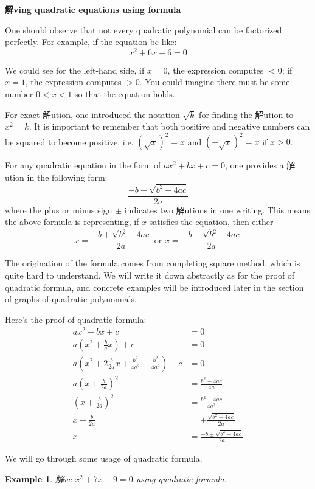 \documentclass[12pt]{article}
\newtheorem{example}{Example}
\begin{document}
    \begin{center}
        \textbf{解ving quadratic equations using formula}
    \end{center}

    One should observe that not every quadratic polynomial can be factorized perfectly. For example, if the equation be like:$$x^2+6x-6=0$$

    We could see for the left-hand side, if $x=0$, the expression computes $<0$; if $x=1$, the expression computes $>0$. You could imagine there must be some number $0<x<1$ so that the equation holds.
    
    For exact 解ution, one introduced the notation $\sqrt{k}$ for finding the 解ution to $x^2=k$. It is important to remember that both positive and negative numbers can be squared to become positive, i.e. $(\sqrt{x})^2=x$ and $(-\sqrt{x})^2=x$ if $x>0$.

    For any quadratic equation in the form of $ax^2+bx+c=0$, one provides a 解ution in the following form:$$\frac{-b\pm\sqrt{b^2-4ac}}{2a}$$where the plus or minus sign $\pm$ indicates two 解utions in one writing. This means the above formula is representing, if $x$ satisfies the equation, then either $$x=\frac{-b+\sqrt{b^2-4ac}}{2a}\textrm{ or }x=\frac{-b-\sqrt{b^2-4ac}}{2a}$$ 
    
    The origination of the formula comes from completing square method, which is quite hard to understand. We will write it down abstractly as for the proof of quadratic formula, and concrete examples will be introduced later in the section of graphs of quadratic polynomials.

    Here's the proof of quadratic formula:\begin{align*}
        ax^2+bx+c&=0\\
        a(x^2+\frac{b}{a}x)+c&=0\\
        a(x^2+2\frac{b}{2a}x+\frac{b^2}{4a^2}-\frac{b^2}{4a^2})+c&=0\\
        a(x+\frac{b}{2a})^2&=\frac{b^2-4ac}{4a}\\
        (x+\frac{b}{2a})^2&=\frac{b^2-4ac}{4a^2}\\
        x+\frac{b}{2a}&=\pm\frac{\sqrt{b^2-4ac}}{2a}\\
        x&=\frac{-b\pm\sqrt{b^2-4ac}}{2a}
    \end{align*}

    We will go through some usage of quadratic formula.

    \begin{example}
        解ve $x^2+7x-9=0$ using quadratic formula.
    \end{example}
\end{document}
